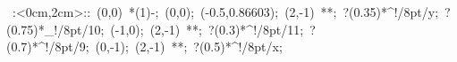 %


\hbox{
\xy    <2cm,0cm>:<0cm,2cm>::
       (0,0) *\ellipse(1){-}; (0,0); 
       (-0.5,0.86603); (2,-1) **\dir{-}; ?(0.35)*^!/8pt/{y}; ?(0.75)*_!/8pt/{10};
       (-1,0); (2,-1) **\dir{-}; ?(0.3)*^!/8pt/{11}; ?(0.7)*^!/8pt/{9};
       (0,-1); (2,-1) **\dir{-}; ?(0.5)*^!/8pt/{x};         
\endxy}

